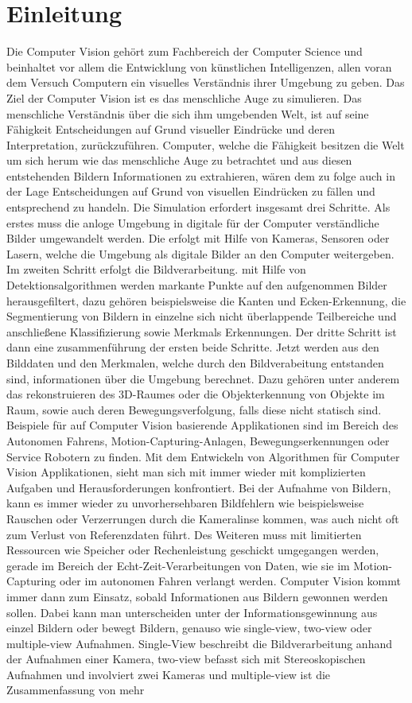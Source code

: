 \chapter{Einleitung}
\label{sec:einleitung} 

Die Computer Vision gehört zum Fachbereich der Computer Science und beinhaltet vor allem die Entwicklung von künstlichen Intelligenzen, allen voran dem Versuch Computern ein visuelles Verständnis ihrer Umgebung zu geben. Das Ziel der Computer Vision ist es das menschliche Auge zu simulieren. Das menschliche Verständnis über die sich ihm umgebenden Welt, ist auf seine Fähigkeit Entscheidungen auf Grund visueller Eindrücke und deren Interpretation, zurückzuführen. Computer, welche die Fähigkeit besitzen die Welt um sich herum wie das menschliche Auge zu betrachtet und aus diesen entstehenden Bildern Informationen zu extrahieren, wären dem zu folge auch in der Lage Entscheidungen auf Grund von visuellen Eindrücken zu fällen und entsprechend zu handeln. Die Simulation erfordert insgesamt drei Schritte. Als erstes muss die anloge Umgebung in digitale für der Computer verständliche Bilder umgewandelt werden. Die erfolgt mit Hilfe von Kameras, Sensoren oder Lasern, welche die Umgebung als digitale Bilder an den Computer weitergeben. Im zweiten Schritt erfolgt die Bildverarbeitung. mit Hilfe von Detektionsalgorithmen werden markante Punkte auf den aufgenommen Bilder herausgefiltert, dazu gehören beispielsweise die Kanten und Ecken-Erkennung, die Segmentierung von Bildern in einzelne sich nicht überlappende Teilbereiche und anschließene Klassifizierung sowie Merkmals Erkennungen. Der dritte Schritt ist dann eine zusammenführung der ersten beide Schritte. Jetzt werden aus den Bilddaten und den Merkmalen, welche durch den Bildverabeitung entstanden sind, informationen über die Umgebung berechnet. Dazu gehören unter anderem das rekonstruieren des 3D-Raumes oder die Objekterkennung von Objekte im Raum, sowie auch deren Bewegungsverfolgung, falls diese nicht statisch sind. Beispiele für auf Computer Vision basierende Applikationen sind im Bereich des Autonomen Fahrens, Motion-Capturing-Anlagen, Bewegungserkennungen oder Service Robotern zu finden. Mit dem Entwickeln von Algorithmen für Computer Vision Applikationen, sieht man sich mit immer wieder mit komplizierten Aufgaben und Herausforderungen konfrontiert. Bei der Aufnahme von Bildern, kann es immer wieder zu unvorhersehbaren Bildfehlern wie beispielsweise Rauschen oder Verzerrungen durch die Kameralinse kommen, was auch nicht oft zum Verlust von Referenzdaten führt. Des Weiteren muss mit limitierten Ressourcen wie Speicher oder Rechenleistung geschickt umgegangen werden, gerade im Bereich der Echt-Zeit-Verarbeitungen von Daten, wie sie im Motion-Capturing oder im autonomen Fahren verlangt werden. Computer Vision kommt immer dann zum Einsatz, sobald Informationen aus Bildern gewonnen werden sollen. Dabei kann man unterscheiden unter der Informationsgewinnung aus einzel Bildern oder bewegt Bildern, genauso wie single-view, two-view oder multiple-view Aufnahmen. Single-View beschreibt die Bildverarbeitung anhand der Aufnahmen einer Kamera, two-view befasst sich mit Stereoskopischen Aufnahmen und involviert zwei Kameras und multiple-view ist die Zusammenfassung von mehr 